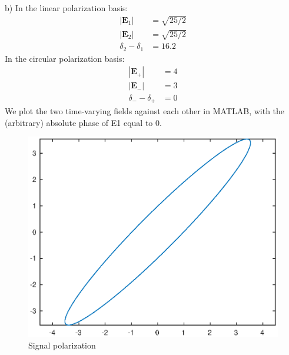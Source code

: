 \documentclass[a4paper,11pt]{article}
\numberwithin{equation}{section}
\newcommand{\bv}[1]{\mathbf{#1}}
\begin{document}
\\
b) In the linear polarization basis:
\begin{align}
 |\bv{E}_1| &= \sqrt{25/2}\\
 |\bv{E}_2| &= \sqrt{25/2}\\
 \delta_2-\delta_1 &= 16.2
\end{align}
In the circular polarization basis:
\begin{align}
 |\bv{E}_+| &= 4\\
 |\bv{E}_-| &= 3\\
 \delta_--\delta_+ &= 0
\end{align}
We plot the two time-varying fields against each other in MATLAB, with the (arbitrary) absolute phase of E1 equal to 0.
\begin{figure}[p]
 \caption{Signal polarization}
 \centering
   \includegraphics[width=\textwidth]{p71b}
\end{figure}
\end{document}
